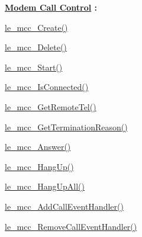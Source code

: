 {\bfseries \hyperlink{c_mcc}{Modem Call Control} \+:}
\begin{DoxyItemize}
\item \hyperlink{le__mcc__interface_8h_a42130fc6b1d69413a387e3292117b3d3}{le\+\_\+mcc\+\_\+\+Create()}
\item \hyperlink{le__mcc__interface_8h_a1a016e6443df2d3ee99113649f4f34ae}{le\+\_\+mcc\+\_\+\+Delete()}
\item \hyperlink{le__mcc__interface_8h_a72a32869bb23864b3e86c606368bed70}{le\+\_\+mcc\+\_\+\+Start()}
\item \hyperlink{le__mcc__interface_8h_a07e4856dffdbf887f51879e39ec43e42}{le\+\_\+mcc\+\_\+\+Is\+Connected()}
\item \hyperlink{le__mcc__interface_8h_a6b5922dc325e4f45c90b2ecfd0f0a74f}{le\+\_\+mcc\+\_\+\+Get\+Remote\+Tel()}
\item \hyperlink{le__mcc__interface_8h_ab16921abc02e0569b129f4a7d92bf3c9}{le\+\_\+mcc\+\_\+\+Get\+Termination\+Reason()}
\item \hyperlink{le__mcc__interface_8h_a598349c6ccfa151dbd1d2f2a9c293ca4}{le\+\_\+mcc\+\_\+\+Answer()}
\item \hyperlink{le__mcc__interface_8h_a7b9567715a3cd30c83a3b6886eeb2044}{le\+\_\+mcc\+\_\+\+Hang\+Up()}
\item \hyperlink{le__mcc__interface_8h_a38ac8543a579ecc81430c121a64bd346}{le\+\_\+mcc\+\_\+\+Hang\+Up\+All()}
\item \hyperlink{le__mcc__interface_8h_ab826cf4b9e3911e659a90d483081e7fe}{le\+\_\+mcc\+\_\+\+Add\+Call\+Event\+Handler()}
\item \hyperlink{le__mcc__interface_8h_aa7682ff49924db10aefee547fcb0b4d8}{le\+\_\+mcc\+\_\+\+Remove\+Call\+Event\+Handler()}
\end{DoxyItemize}

